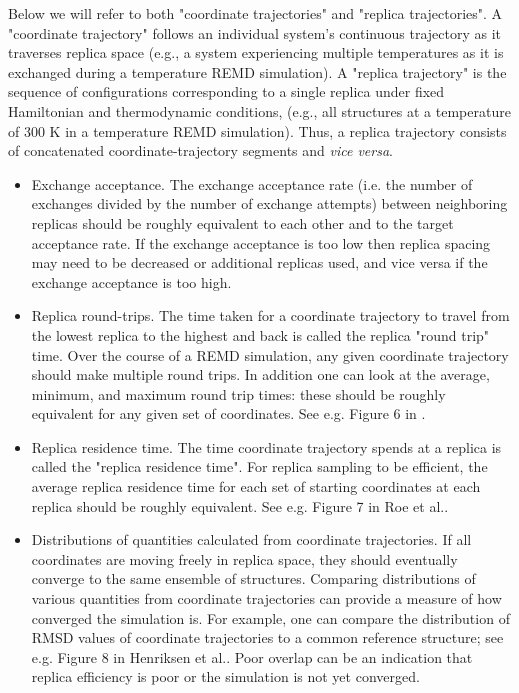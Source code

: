 Below we will refer to both "coordinate trajectories" and "replica trajectories". A "coordinate trajectory" follows an individual system's continuous trajectory as it traverses replica space (e.g., a system experiencing multiple temperatures as it is exchanged during a temperature REMD simulation). A "replica trajectory" is the sequence of configurations corresponding to a single replica under fixed Hamiltonian and thermodynamic conditions, (e.g., all structures at a temperature of 300 K in a temperature REMD simulation).  Thus, a replica trajectory consists of concatenated coordinate-trajectory segments and \textit{vice versa}.

\begin{itemize}
  \item Exchange acceptance. The exchange acceptance rate (i.e. the number of exchanges divided by the number of exchange attempts) between neighboring replicas should be roughly equivalent to each other and to the target acceptance rate. If the exchange acceptance is too low then replica spacing may need to be decreased or additional replicas used, and vice versa if the exchange acceptance is too high.
  \item Replica round-trips. The time taken for a coordinate trajectory to travel from the lowest replica to the highest and back is called the replica "round trip" time. Over the course of a REMD simulation, any given coordinate trajectory should make multiple round trips. In addition one can look at the average, minimum, and maximum round trip times: these should be roughly equivalent for any given set of coordinates. See e.g. Figure 6 in \citep{Roe2014}.
  \item Replica residence time. The time coordinate trajectory spends at a replica is called the "replica residence time". For replica sampling to be efficient, the average replica residence time for each set of starting coordinates at each replica should be roughly equivalent. See e.g. Figure 7 in Roe et al..\citep{Roe2014}
  \item Distributions of quantities calculated from coordinate trajectories. If all coordinates are moving freely in replica space, they should eventually converge to the same ensemble of structures. Comparing distributions of various quantities from coordinate trajectories can provide a measure of how converged the simulation is. For example, one can compare the distribution of RMSD values of coordinate trajectories to a common reference structure; see e.g. Figure 8 in Henriksen et al..\citep{Henriksen2013} Poor overlap can be an indication that replica efficiency is poor or the simulation is not yet converged.
\end{itemize}

